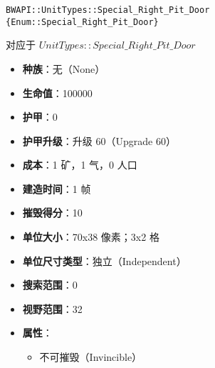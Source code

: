 \begin{tcolorbox}[colback=white, colframe=black!60!white, title=Special\_Right\_Pit\_Door(), arc=0mm]
    \begin{verbatim}
BWAPI::UnitTypes::Special_Right_Pit_Door {Enum::Special_Right_Pit_Door}
    \end{verbatim}
    对应于  $UnitTypes::Special\_Right\_Pit\_Door$ 
    \begin{itemize}
        \item \textbf{种族}：无（None）
        \item \textbf{生命值}：100000
        \item \textbf{护甲}：0
        \item \textbf{护甲升级}：升级 60（Upgrade 60）
        \item \textbf{成本}：1 矿，1 气，0 人口
        \item \textbf{建造时间}：1 帧
        \item \textbf{摧毁得分}：10
        \item \textbf{单位大小}：70x38 像素；3x2 格
        \item \textbf{单位尺寸类型}：独立（Independent）
        \item \textbf{搜索范围}：0
        \item \textbf{视野范围}：32
        \item \textbf{属性}：
            \begin{itemize}
                \item 不可摧毁（Invincible）
            \end{itemize}
    \end{itemize}
\end{tcolorbox}

